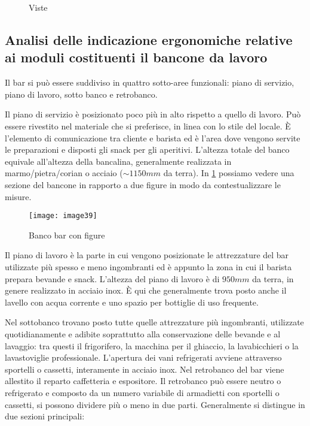 \begin{figure}[H]
	\captionsetup[subfloat]{farskip=2pt,captionskip=8pt}
	\centering
	\hspace{1cm}
	
	\caption{Viste}
\end{figure}




\subsection{Analisi delle indicazione ergonomiche relative ai moduli costituenti il bancone da lavoro }

Il bar si può essere suddiviso in quattro sotto-aree funzionali: piano di servizio, piano di lavoro, sotto banco  e retrobanco.

Il piano di servizio è posizionato poco più in alto rispetto a quello di lavoro. Può essere rivestito nel materiale che si preferisce, in linea con lo stile del locale. 
È l’elemento di comunicazione tra cliente e barista ed è l’area dove vengono servite le preparazioni e disposti gli snack per gli aperitivi. L'altezza totale del banco equivale all'altezza della bancalina, generalmente realizzata in marmo/pietra/corian o acciaio  ($\sim  1150mm$ da terra). In \cref{fig:persone} possiamo vedere una sezione del bancone in rapporto a due figure in modo da contestualizzare le misure.

\begin{figure}[H]
	\centering
	\texttt{[image: image39]}
	\caption{Banco bar con figure}
	\label{fig:persone}
\end{figure}

\noindent
Il piano di lavoro è la parte in cui vengono posizionate le attrezzature del bar utilizzate più spesso e meno ingombranti ed è appunto la zona in cui il barista prepara bevande e snack. L’altezza del piano di lavoro è di  $950mm$ da terra, in genere realizzato in acciaio inox. È qui che generalmente trova posto anche il lavello con acqua corrente e uno spazio per bottiglie di uso frequente.


Nel sottobanco trovano posto tutte quelle attrezzature più ingombranti, utilizzate quotidianamente e adibite soprattutto alla conservazione delle bevande e al lavaggio: tra questi il frigorifero, la macchina per il ghiaccio, la lavabicchieri o la lavastoviglie professionale. L'apertura dei vani refrigerati avviene attraverso sportelli o cassetti, interamente  in acciaio inox. Nel retrobanco del bar viene allestito il reparto caffetteria e espositore. Il retrobanco può essere neutro o refrigerato e composto da un numero variabile di armadietti con sportelli o cassetti, si possono dividere più o meno in due parti. Generalmente si distingue in due sezioni principali:


